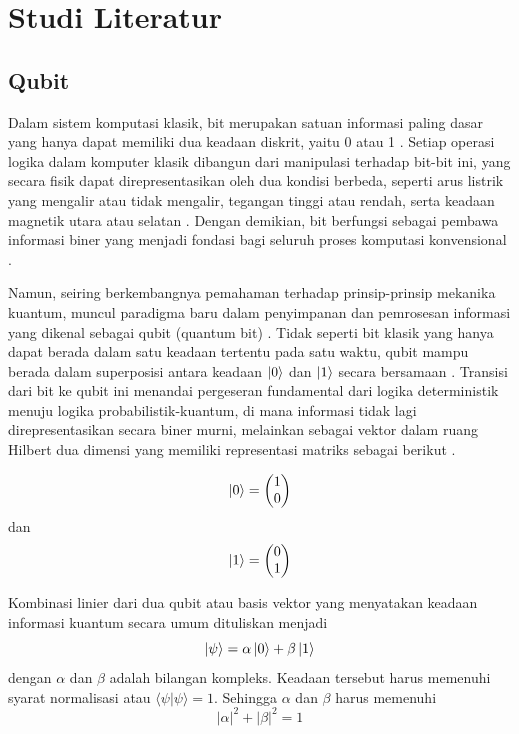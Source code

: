 \chapter{Studi Literatur}

\section{Qubit}
\par
Dalam sistem komputasi klasik, bit merupakan satuan informasi paling dasar yang hanya dapat memiliki dua keadaan diskrit, yaitu 0 atau 1 \cite{nielsen2010quantum}. Setiap operasi logika dalam komputer klasik dibangun dari manipulasi terhadap bit-bit ini, yang secara fisik dapat direpresentasikan oleh dua kondisi berbeda, seperti arus listrik yang mengalir atau tidak mengalir, tegangan tinggi atau rendah, serta keadaan magnetik utara atau selatan \cite{tanenbaum2013structured}. Dengan demikian, bit berfungsi sebagai pembawa informasi biner yang menjadi fondasi bagi seluruh proses komputasi konvensional \cite{shannon1948mathematical}.
\par
Namun, seiring berkembangnya pemahaman terhadap prinsip-prinsip mekanika kuantum, muncul paradigma baru dalam penyimpanan dan pemrosesan informasi yang dikenal sebagai qubit (quantum bit) \cite{nielsen2010quantum}. Tidak seperti bit klasik yang hanya dapat berada dalam satu keadaan tertentu pada satu waktu, qubit mampu berada dalam superposisi antara keadaan $\ket{0}$ dan $\ket{1}$ secara bersamaan \cite{dirac1981principles}. Transisi dari bit ke qubit ini menandai pergeseran fundamental dari logika deterministik menuju logika probabilistik-kuantum, di mana informasi tidak lagi direpresentasikan secara biner murni, melainkan sebagai vektor dalam ruang Hilbert dua dimensi yang memiliki representasi matriks sebagai berikut \cite{sakurai2017modern}.

\begin{equation}
	\ket{0} = \begin{pmatrix} 1 \\ 0 \end{pmatrix}
\end{equation}
dan
\begin{equation}
	\ket{1} = \begin{pmatrix} 0 \\ 1 \end{pmatrix}
\end{equation}
\par
Kombinasi linier dari dua qubit atau basis vektor yang menyatakan keadaan informasi kuantum secara umum dituliskan menjadi
\begin{equation}
	\ket{\psi} = \alpha \ket{0} + \beta \ket{1}\label{keadaanumum}
\end{equation}
dengan $\alpha$ dan $\beta$ adalah bilangan kompleks. Keadaan tersebut harus memenuhi syarat normalisasi atau $\langle \psi | \psi \rangle = 1$. Sehingga $\alpha$ dan $\beta$ harus memenuhi
\begin{equation}
	|\alpha|^2 + |\beta|^2 = 1
\end{equation}

